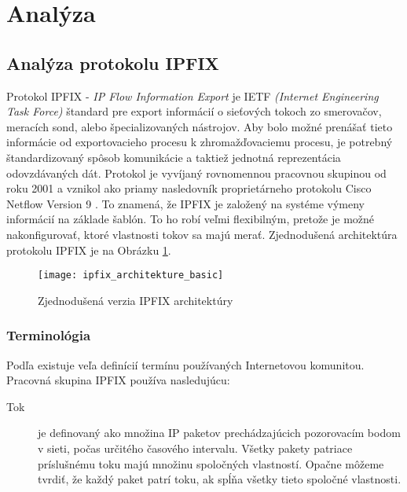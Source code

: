 \section{Anal\'yza}

\subsection{Anal\'yza protokolu IPFIX}

Protokol IPFIX - \emph{IP Flow Information Export} je IETF \emph{(Internet Engineering Task Force)}
štandard pre export informácií o sieťových tokoch zo smerovačov, meracích sond, 
alebo špecializovaných nástrojov. 
Aby bolo možné prenášať tieto informácie 
od exportovacieho procesu k zhromažďovaciemu procesu, je potrebný štandardizovaný 
spôsob komunikácie a taktiež jednotná reprezentácia odovzdávaných dát.
Protokol je vyvíjaný rovnomennou pracovnou skupinou \citep{ipfixCharter} od roku 2001 a 
vznikol ako priamy nasledovník proprietárneho protokolu Cisco Netflow Version 9 \citep{rfc3954}. 
To znamená, že IPFIX je založený na systéme výmeny informácií na základe šablón. To ho robí veľmi
flexibilným, pretože je možné nakonfigurovať, ktoré vlastnosti tokov sa majú merať.
Zjednodušená architektúra protokolu IPFIX je na Obrázku \ref{o:ipfix_architekture_basic}. 
\citep{rfc5101, ipfixProtocol, juvhaugen, veri}

\begin{figure}[ht!]
\centering
\texttt{[image: ipfix\_architekture\_basic]}
\caption{Zjednodušená verzia IPFIX architektúry}\label{o:ipfix_architekture_basic}
\end{figure}

\subsubsection{Terminológia} \label{sec:ipfix_terminology}

Podľa \citep{rfc3917} existuje veľa definícií termínu  používaných Internetovou komunitou.
Pracovná skupina IPFIX používa nasledujúcu:
\begin{description}
  \item[Tok] je definovaný ako množina IP paketov prechádzajúcich pozorovacím bodom v sieti, počas určitého 
časového intervalu. Všetky pakety patriace príslušnému toku majú množinu spoločných vlastností. Opačne 
môžeme tvrdiť, že každý paket patrí toku, ak spĺňa všetky tieto spoločné vlastnosti. 
\end{description}

